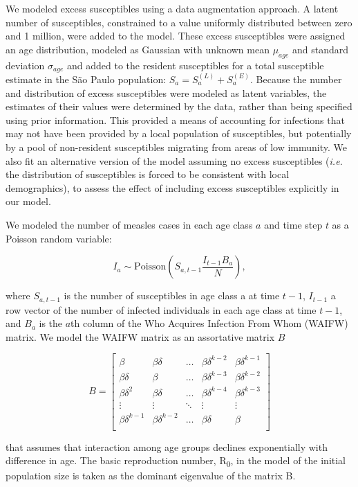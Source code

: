 We modeled excess susceptibles using a data augmentation approach. A latent number of susceptibles, constrained to a value uniformly distributed between zero and 1 million, were added to the model. These excess susceptibles were assigned an age distribution, modeled as Gaussian with unknown mean \(\mu_{age}\) and standard deviation \(\sigma_{age}\) and added to the resident susceptibles for a total susceptible estimate in the S\~{a}o Paulo population: \(S_a = S_a^{(L)} + S_a^{(E)}\). Because the number and distribution of excess susceptibles were modeled as latent variables, the estimates of their values were determined by the data, rather than being specified using prior information. This provided a means of accounting for infections that may not have been provided by a local population of susceptibles, but potentially by a pool of non-resident susceptibles migrating from areas of low immunity. We also fit an alternative version of the model assuming no excess susceptibles (\emph{i.e.} the distribution of susceptibles is forced to be consistent with local demographics), to assess the effect of including excess susceptibles explicitly in our model.

We modeled the number of measles cases in each age class \(a\) and time step \(t\) as a Poisson random variable:

\begin{equation}
I_a \sim \text{Poisson}\left(S_{a,t-1} \frac{I_{t-1}B_a}{N} \right),
\end{equation}

where \(S_{a,t-1}\) is the number of susceptibles in age class a at time \(t-1\), \(I_{t-1}\) a row vector of the number of infected individuals in each age class at time \(t-1\), and \(B_a\) is the \(a\)th column of the Who Acquires Infection From Whom (WAIFW) matrix.  We model the WAIFW matrix as an assortative matrix \(B\)

\begin{equation}
B = \left[{
\begin{array}{ccccc}
  {\beta} & {\beta \delta} & \ldots & {\beta \delta^{k-2}} & {\beta \delta^{k-1}}  \\
  {\beta \delta} & {\beta} & \ldots & {\beta \delta^{k-3}} & {\beta \delta^{k-2}} \\
{\beta \delta^2} & {\beta \delta} & \ldots & {\beta \delta^{k-4}} & {\beta \delta^{k-3}}  \\
  \vdots & \vdots & \ddots & \vdots & \vdots \\
  {\beta \delta^{k-1}} & {\beta \delta^{k-2}} & \ldots & {\beta \delta} & {\beta}  \\
\end{array}
}\right]
\end{equation}

that assumes that interaction among age groups declines exponentially with difference in age. The basic reproduction number, R\textsubscript{0}, in the model of the initial population size is taken as the dominant eigenvalue of the matrix B.